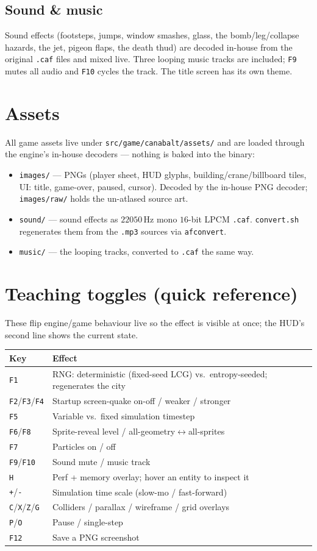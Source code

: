 \documentclass[11pt]{report}
\newcommand{\code}[1]{\texttt{#1}}
\begin{document}
\section{Sound \& music}
Sound effects (footsteps, jumps, window smashes, glass, the bomb/leg/collapse
hazards, the jet, pigeon flaps, the death thud) are decoded in-house from the
original \code{.caf} files and mixed live. Three looping music tracks are included;
\code{F9} mutes all audio and \code{F10} cycles the track. The title screen has its
own theme.

\chapter{Assets}
All game assets live under \code{src/game/canabalt/assets/} and are loaded through
the engine's in-house decoders --- nothing is baked into the binary:
\begin{itemize}[nosep]
  \item \code{images/} --- PNGs (player sheet, HUD glyphs, building/crane/billboard
        tiles, UI: title, game-over, paused, cursor). Decoded by the in-house PNG
        decoder; \code{images/raw/} holds the un-atlased source art.
  \item \code{sound/} --- sound effects as $22050$\,Hz mono $16$-bit LPCM
        \code{.caf}. \code{convert.sh} regenerates them from the \code{.mp3}
        sources via \code{afconvert}.
  \item \code{music/} --- the looping tracks, converted to \code{.caf} the same way.
\end{itemize}

\chapter{Teaching toggles (quick reference)}
These flip engine/game behaviour live so the effect is visible at once; the HUD's
second line shows the current state.
\begin{longtable}{ll}
\toprule
Key & Effect \\
\midrule
\endhead
\code{F1} & RNG: deterministic (fixed-seed LCG) vs.\ entropy-seeded; regenerates the city \\
\code{F2}/\code{F3}/\code{F4} & Startup screen-quake on-off / weaker / stronger \\
\code{F5} & Variable vs.\ fixed simulation timestep \\
\code{F6}/\code{F8} & Sprite-reveal level / all-geometry$\leftrightarrow$all-sprites \\
\code{F7} & Particles on / off \\
\code{F9}/\code{F10} & Sound mute / music track \\
\code{H} & Perf + memory overlay; hover an entity to inspect it \\
\code{+}/\code{-} & Simulation time scale (slow-mo / fast-forward) \\
\code{C}/\code{X}/\code{Z}/\code{G} & Colliders / parallax / wireframe / grid overlays \\
\code{P}/\code{O} & Pause / single-step \\
\code{F12} & Save a PNG screenshot \\
\bottomrule
\end{longtable}
\end{document}
